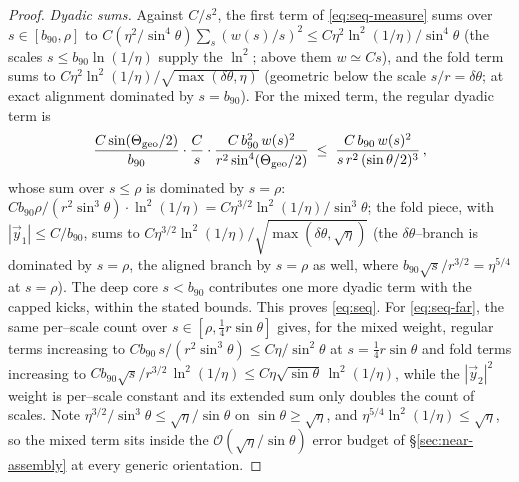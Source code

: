 \documentclass[11pt]{article}
\newcommand{\order}[1]{\mathcal O\!\left(#1\right)}
\begin{document}
\begin{proof}
\emph{Dyadic sums.} Against $C/s^2$, the first term of \eqref{eq:seq-measure} sums over
$s\in[b_{90},\rho]$ to $C(\eta^2/\sin^4\theta)\sum_s(w(s)/s)^2\le
C\eta^2\ln^2(1/\eta)/\sin^4\theta$ (the scales $s\le b_{90}\ln(1/\eta)$ supply the $\ln^2$; above
them $w\simeq Cs$), and the fold term sums to
$C\eta^2\ln^2(1/\eta)\big/\sqrt{\max(\delta\theta,\eta)}$ (geometric below the scale
$s/r=\delta\theta$; at exact alignment dominated by $s=b_{90}$). For the mixed term, the regular
dyadic term is
\begin{equation*}
  \frac{C\sin(\Theta_{\rm geo}/2)}{b_{90}}\cdot\frac{C}{s}\cdot
  \frac{C\,b_{90}^2\,w(s)^2}{r^2\sin^4(\Theta_{\rm geo}/2)}
  \;\le\;\frac{C\,b_{90}\,w(s)^2}{s\,r^2\,(\sin\theta/2)^3}\,,
\end{equation*}
whose sum over $s\le\rho$ is dominated by $s=\rho$:
$Cb_{90}\rho/(r^2\sin^3\theta)\cdot\ln^2(1/\eta)=C\eta^{3/2}\ln^2(1/\eta)/\sin^3\theta$; the fold
piece, with $|\vec y_1|\le C/b_{90}$, sums to
$C\eta^{3/2}\ln^2(1/\eta)\big/\sqrt{\max(\delta\theta,\sqrt\eta)}$ (the $\delta\theta$--branch is
dominated by $s=\rho$, the aligned branch by $s=\rho$ as well, where
$b_{90}\sqrt{s}/r^{3/2}=\eta^{5/4}$ at $s=\rho$). The deep core $s<b_{90}$ contributes one more
dyadic term with the capped kicks, within the stated bounds. This proves \eqref{eq:seq}. For
\eqref{eq:seq-far}, the same per--scale count over $s\in[\rho,\tfrac14 r\sin\theta]$ gives, for
the mixed weight, regular terms increasing to $Cb_{90}\,s/(r^2\sin^3\theta)\le C\eta/\sin^2\theta$
at $s=\tfrac14 r\sin\theta$ and fold terms increasing to
$Cb_{90}\sqrt s/r^{3/2}\,\ln^2(1/\eta)\le C\eta\sqrt{\sin\theta}\,\ln^2(1/\eta)$, while the
$|\vec y_2|^2$ weight is per--scale constant and its extended sum only doubles the count of
scales. Note $\eta^{3/2}/\sin^3\theta\le\sqrt\eta/\sin\theta$ on $\sin\theta\ge\sqrt\eta$, and
$\eta^{5/4}\ln^2(1/\eta)\le\sqrt\eta$, so the mixed term sits inside the
$\order{\sqrt\eta/\sin\theta}$ error budget of \S\ref{sec:near-assembly} at every generic
orientation.
\end{proof}
\end{document}
